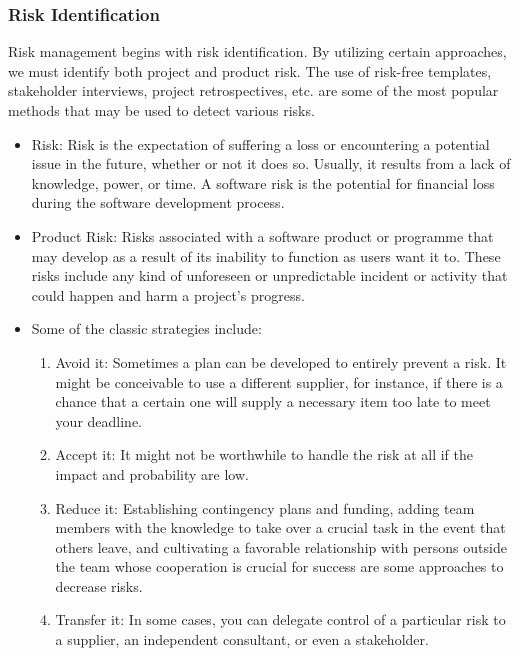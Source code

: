 \documentclass[oneside, 12pt]{book}
\begin{document}
			\subsubsection{Risk Identification}
				Risk management begins with risk identification. By utilizing certain approaches, we must identify both project and product risk. The use of risk-free templates, stakeholder interviews, project retrospectives, etc. are some of the most popular methods that may be used to detect various risks.
				\begin{itemize}
					\item Risk: Risk is the expectation of suffering a loss or encountering a potential issue in the future, whether or not it does so. Usually, it results from a lack of knowledge, power, or time. A software risk is the potential for financial loss during the software development process.
					\item Product Risk: Risks associated with a software product or programme that may develop as a result of its inability to function as users want it to. These risks include any kind of unforeseen or unpredictable incident or activity that could happen and harm a project's progress. 
					\item Some of the classic strategies include:
					\begin{enumerate}
						\item Avoid it: Sometimes a plan can be developed to entirely prevent a risk. It might be conceivable to use a different supplier, for instance, if there is a chance that a certain one will supply a necessary item too late to meet your deadline.
						\item Accept it: It might not be worthwhile to handle the risk at all if the impact and probability are low. 
						\item Reduce it: Establishing contingency plans and funding, adding team members with the knowledge to take over a crucial task in the event that others leave, and cultivating a favorable relationship with persons outside the team whose cooperation is crucial for success are some approaches to decrease risks.
						\item Transfer it: In some cases, you can delegate control of a particular risk to a supplier, an independent consultant, or even a stakeholder.
					\end{enumerate}
				\end{itemize}
\end{document}
